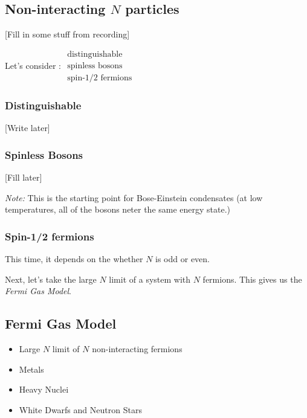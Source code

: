 \documentclass{article}
\begin{document}
\vskip 1cm
\subsection{Non-interacting $N$ particles}

[Fill in some stuff from recording]


\vskip 0.5cm
Let's consider : $\begin{matrix}
  \text{distinguishable} \\ \text{spinless bosons} \\ \text{spin-1/2 fermions}
\end{matrix}$

\vskip 0.5cm
\subsubsection{Distinguishable}

[Write later]

\vskip 0.5cm
\subsubsection{Spinless Bosons}

[Fill later]

\emph{Note:} This is the starting point for Bose-Einstein condensates (at low temperatures, all of the bosons neter the same energy state.)

\vskip 0.5cm
\subsubsection{Spin-1/2 fermions}

This time, it depends on the whether $N$ is odd or even.


\vskip 0.5cm
Next, let's take the large $N$ limit of a system with $N$ fermions. This gives us the \emph{Fermi Gas Model}.

\vskip 1cm
\subsection{Fermi Gas Model}
\begin{itemize}
  \item Large $N$ limit of $N$ non-interacting fermions
  \item Metals
  \item Heavy Nuclei
  \item White Dwarfs and Neutron Stars
\end{itemize}
\end{document}
